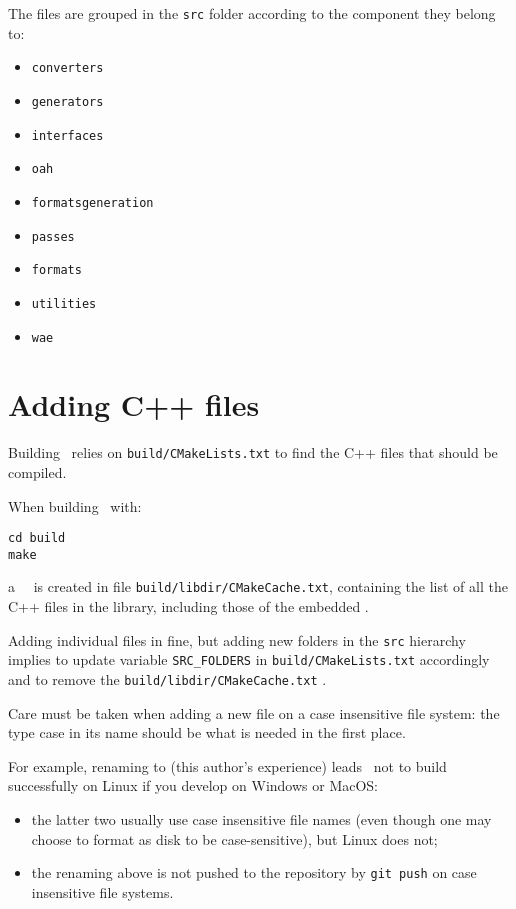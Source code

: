 The files are grouped in the {\tt src} folder according to the component they belong to:
\begin{itemize}
\item {\tt converters}
\item {\tt generators}
\item {\tt interfaces}
\item {\tt oah}
\item {\tt formatsgeneration}
\item {\tt passes}
\item {\tt formats}
\item {\tt utilities}
\item {\tt wae}
\end{itemize}


\section{Adding C++ files}

Building \mf\ relies on {\tt build/CMakeLists.txt} to find the C++ files that should be compiled.

When building \mf\ with:
\begin{lstlisting}[language=Terminal]
cd build
make
\end{lstlisting}
a \cmake\ \cache\ is created in file {\tt build/libdir/CMakeCache.txt}, containing the list of all the C++ files in the library, including those of the embedded \libmusicxml.

Adding individual files in fine, but adding new folders in the {\tt src} hierarchy implies to update variable {\tt SRC_FOLDERS} in {\tt build/CMakeLists.txt} accordingly and to remove the {\tt build/libdir/CMakeCache.txt} \cache.

Care must be taken when adding a new file on a case insensitive file system: the type case in its name should be what is needed in the first place.

For example, renaming  to  (this author's experience) leads \mf\ not to build successfully on Linux if you develop on Windows or MacOS:
\begin{itemize}
\item the latter two usually use case insensitive file names (even though one may choose to format as disk to be case-sensitive), but Linux does not;
\item the renaming above is not pushed to the repository by {\tt git push} on case insensitive file systems.
\end{itemize}

